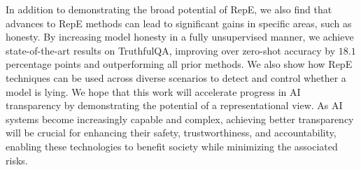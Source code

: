 In addition to demonstrating the broad potential of RepE, we also find that advances to RepE methods can lead to significant gains in specific areas, such as honesty. By increasing model honesty in a fully unsupervised manner, we achieve state-of-the-art results on TruthfulQA, improving over zero-shot accuracy by $18.1$ percentage points and outperforming all prior methods. We also show how RepE techniques can be used across diverse scenarios to detect and control whether a model is lying. We hope that this work will accelerate progress in AI transparency by demonstrating the potential of a representational view. As AI systems become increasingly capable and complex, achieving better transparency will be crucial for enhancing their safety, trustworthiness, and accountability, enabling these technologies to benefit society while minimizing the associated risks.



































































